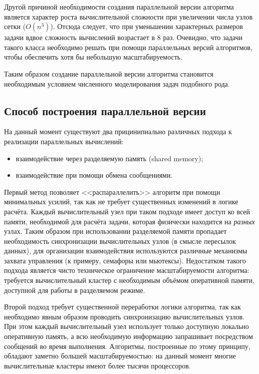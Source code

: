 Другой причиной необходимости создания параллельной версии алгоритма является характер роста вычислительной сложности при увеличении числа узлов сетки ($O(n^3)$). Отсюда следует, что при уменьшении характерных размеров задачи вдвое сложность вычислений возрастает в 8 раз. Очевидно, что задачи такого класса необходимо решать при помощи параллельных версий алгоритмов, чтобы обеспечить хотя бы небольшую масштабируемость.

Таким образом создание параллельной версии алгоритма становится необходимым условием численного моделирования задач подобного рода.

\subsection{Способ построения параллельной версии}
На данный момент существуют два прицинипиально различных подхода к реализации параллельных вычислений:
\begin{itemize}
\item взаимодействие через разделяемую память (shared memory);
\item взаимодействие при помощи обмена сообщениями.
\end{itemize}

Первый метод позволяет <<распараллелить>> алгоритм при помощи минимальных усилий, так как не требует существенных изменений в логике расчёта. Каждый вычислительный узел при таком подходе имеет доступ ко всей памяти, необходимой для расчёта задачи, которая физически находится на \emph{разных} узлах. Таким образом при использовании разделяемой памяти пропадает необходимость синхронизации вычислительных узлов (в смысле пересылок данных), для организации взаимодействия используются различные механизмы захвата управления (к примеру, семафоры или мьютексы). Недостатком такого подхода является чисто техническое ограничение масштабируемости алгоритма: требуется вычислительный кластер с необходимым объёмом оперативной памяти, доступной для работы в разделяемом режиме.

Второй подход требует существенной переработки логики алгоритма, так как необходимо явным образом проводить синхронизацию вычислительных узлов. При этом каждый вычислительный узел использует только доступную локально оперативную память, а всю необходимую информацию запрашивает посредством сообщений во время выполнения. Алгоритмы, построенные по этому принципу, обладают заметно большей масштабируемостью: на данный момент многие вычислительные кластеры имеют более тысячи процессоров.

